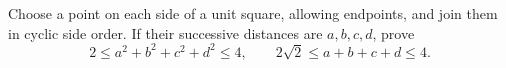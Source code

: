 Choose a point on each side of a unit square, allowing endpoints, and join them in cyclic side order. If their successive distances are $a,b,c,d$, prove
\[
2\le a^2+b^2+c^2+d^2\le4,\qquad
2\sqrt2\le a+b+c+d\le4.
\]
